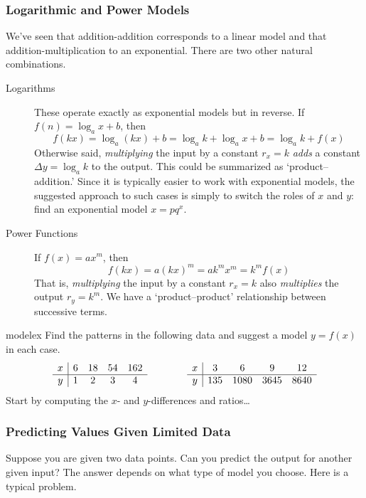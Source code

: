 \subsubsection*{Logarithmic and Power Models}


We've seen that addition-addition corresponds to a linear model and that addition-multiplication to an exponential. There are two other natural combinations.

\begin{description}
	\item[Logarithms] These operate exactly as exponential models but in reverse. If $f(n)=\log_a x+b$, then
		\[
			f(kx)=\log_a(kx)+b=\log_ak+\log_ax+b=\log_ak+f(x)
		\]
		Otherwise said,	\emph{multiplying} the input by a constant $r_x=k$ \emph{adds} a constant $\Delta y=\log_ak$ to the output.	This could be summarized as `product--addition.' Since it is typically easier to work with exponential models, the suggested approach to such cases is simply to switch the roles of $x$ and $y$: find an exponential model $x=pq^x$.
	\item[Power Functions] If $f(x)=ax^m$, then 
		\[
			f(kx)=a(kx)^m=ak^mx^m=k^mf(x)
		\]
		That is, \emph{multiplying} the input by a constant $r_x=k$ also \emph{multiplies} the output $r_y=k^m$.
		We have a `product--product' relationship between successive terms.
\end{description}


\begin{examples}{}{modelex}
	Find the patterns in the following data and suggest a model $y=f(x)$ in each case.
	\[
		\begin{array}[t]{c|cccc}
			x&6&18&54&162\\\hline
			y&1&2&3&4
		\end{array}
		\qquad\qquad
		\begin{array}[t]{c|cccc}
			x&3&6&9&12\\\hline
			y&135&1080&3645&8640
		\end{array}
	\]
	Start by computing the $x$- and $y$-differences and ratios\ldots
\end{examples}


\subsubsection*{Predicting Values Given Limited Data}

Suppose you are given two data points. Can you predict the output for another given input? The answer depends on what type of model you choose. Here is a typical problem.


